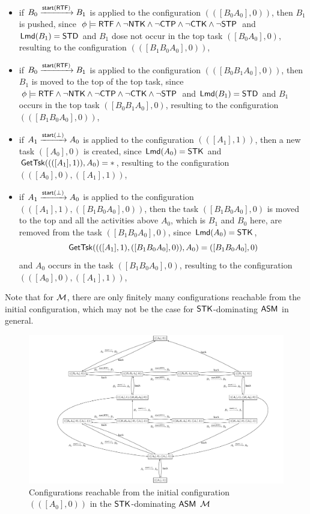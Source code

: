 \begin{example}
\begin{itemize}
	\item if $B_0 \xrightarrow{{\mathsf{start} }({\sf RTF})} B_1$ is applied to the configuration $(([B_0A_0],0))$, then $B_1$ is pushed, since $\phi\models{\sf RTF}\wedge\neg{\sf NTK}\wedge\neg{\sf CTP}\wedge\neg{\sf CTK}\wedge\neg{\sf STP}$ and ${\sf Lmd}(B_1) = \mathsf{STD}$ and $B_1$ dose not occur in the top task $([B_0A_0],0)$, resulting to the configuration 
	$(([B_1B_0A_0],0))$,
	\item if $B_0 \xrightarrow{{\mathsf{start} }({\sf RTF})} B_1$ is applied to the configuration 
	$(([B_0B_1A_0],0))$, then $B_1$ is moved to the top of the top task, since $\phi\models{\sf RTF}\wedge\neg{\sf NTK}\wedge\neg{\sf CTP}\wedge\neg{\sf CTK}\wedge\neg{\sf STP}$ and ${\sf Lmd}(B_1) = \mathsf{STD}$ and $B_1$ occurs in the top task $([B_0B_1A_0],0)$, resulting to the configuration $(([B_1B_0A_0],0))$,
	\item if $A_1 \xrightarrow{{\mathsf{start} }(\bot)} A_0$ is applied to the configuration $(([A_1],1))$, then a new task $([A_0],0)$ is created, since ${\sf Lmd}(A_0) = \mathsf{STK}$ and $\mathsf{GetTsk}((([A_1],1)), A_0) = *$, resulting to the configuration $(([A_0],0),([A_1],1))$,
	\item if $A_1 \xrightarrow{{\mathsf{start} }(\bot)} A_0$ is applied to the configuration $(([A_1],1),([B_1B_0A_0],0))$, then the task $([B_1B_0A_0],0)$ is moved to the top and all the activities above $A_0$, which is $B_1$ and $B_0$ here, are removed from the task $([B_1B_0A_0],0)$, since ${\sf Lmd}(A_0) = \mathsf{STK}$, 
	$$\mathsf{GetTsk}((([A_1],1),([B_1B_0A_0],0)), A_0) = ([B_1B_0A_0],0)$$
	and $A_0$ occurs in the task $([B_1B_0A_0],0)$, resulting to the configuration $(([A_0],0),([A_1],1))$,
	\end{itemize}
	Note that for ${\mathcal{M} }$, there are only finitely many configurations reachable from the initial configuration, which may not be the case for $\mathsf{STK}$-dominating $\textsf{ASM}$ in general.  
	\begin{figure}
			\centering
			\includegraphics[scale = 0.5, trim = 3.5cm 0cm 1.5cm 0cm,clip]{stk-asm-example.pdf}
			\caption{Configurations reachable from the initial configuration $(([A_0], 0))$ in the $\mathsf{STK}$-dominating $\textsf{ASM}$ ${\mathcal{M} }$}
		\label{stk-asm-example}
	\end{figure}


\end{example}
